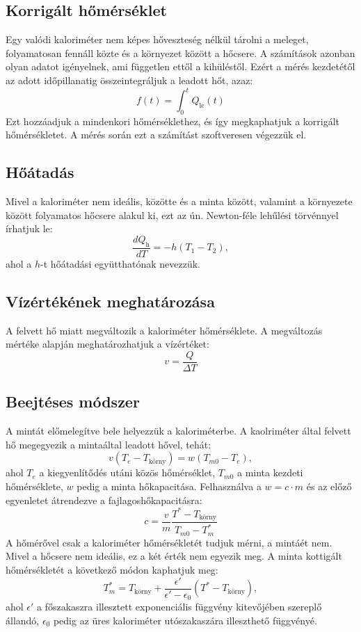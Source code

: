 \documentclass[a4paper, 12pt, oneside]{article}
\begin{document}
\subsection*{Korrigált hőmérséklet}
    Egy valódi kaloriméter nem képes hőveszteség nélkül tárolni a meleget, folyamatosan fennáll közte és a környezet között a hőcsere. A számítások azonban olyan adatot igényelnek, ami független ettől a kihüléstől. Ezért a mérés kezdetétől az adott időpillanatig összeintegráljuk a leadott hőt, azaz:
\begin{equation}
        f(t) = \int_0^t Q_\textrm{le}(t)
\end{equation}
    Ezt hozzáadjuk a mindenkori hőmérséklethez, és így megkaphatjuk a korrigált hőmérsékletet. A mérés során ezt a számítást szoftveresen végezzük el.
\subsection*{Hőátadás}
    Mivel a kaloriméter nem ideális, közötte és a minta között, valamint a környezete között folyamatos hőcsere alakul ki, ezt az ún. Newton-féle lehűlési törvénnyel írhatjuk le:
\begin{equation}
    \frac{dQ_{\textrm{h}}}{dT} = - h(T_{1} - T_{2}),
\end{equation}
    ahol a $h$-t hőátadási együtthatónak nevezzük.
\subsection*{Vízértékének meghatározása}
    A felvett hő miatt megváltozik a kaloriméter hőmérséklete. A megváltozás mértéke alapján meghatározhatjuk a vízértéket:
\begin{equation}
    v = \frac{Q}{\Delta T}
\end{equation}
\subsection*{Beejtéses módszer}
    A mintát előmelegítve bele helyezzük a kaloriméterbe. A kaolriméter által felvett hő megegyezik a mintaáltal leadott hővel, tehát:
\begin{equation}
    v(T_e-T_\textrm{körny}) = w(T_{m0}-T_e),
\end{equation}
    ahol $T_e$ a kiegyenlítődés utáni közös hőmérséklet, $T_{m0}$ a minta kezdeti hőmérséklete, $w$ pedig a minta hőkapacitása. Felhasználva a $w = c \cdot m$ és az előző egyenletet átrendezve a fajlagoshőkapacitásra:
\begin{equation}
        c = \frac{v}{m}\frac{T^*-T_\textrm{körny}}{T_{m0} - T_m^*}
\end{equation}
A hőmérővel csak a kaloriméter hőmérsékletét tudjuk mérni, a mintáét nem. Mivel a hőcsere nem ideális, ez a két érték nem egyezik meg. A minta kottigált hőmérsékletét a következő módon kaphatjuk meg:
\begin{equation}
    T_{m}^* =T_{\textrm{körny}}+\frac{\epsilon'}{\epsilon'-\epsilon_0}(T^*-T_\textrm{körny}),
\end{equation}
ahol $\epsilon'$ a főszakaszra illesztett exponenciális függvény kitevőjében szereplő állandó, $\epsilon_0$ pedig az üres kaloriméter utószakaszára illeszthető függvényé.
\end{document}
